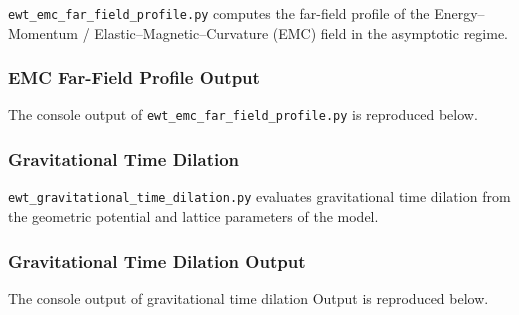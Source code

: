 \documentclass[10pt,a4paper]{article}
\begin{document}
\texttt{ewt\_emc\_far\_field\_profile.py} computes the far-field profile of the Energy--Momentum / Elastic--Magnetic--Curvature (EMC) field in the asymptotic regime.



\subsubsection{EMC Far-Field Profile Output}
\label{app:ewt_emc_far_field_profile_output}

The console output of \texttt{ewt\_emc\_far\_field\_profile.py} is reproduced below.



\subsubsection{Gravitational Time Dilation}
\label{app:ewt_gravitational_time_dilation}

\texttt{ewt\_gravitational\_time\_dilation.py} evaluates gravitational time dilation from the geometric potential and lattice parameters of the model.



\subsubsection{Gravitational Time Dilation Output}
\label{app:ewt_gravitational_time_dilation_output}

The console output of gravitational time dilation Output  is reproduced below.


\end{document}
